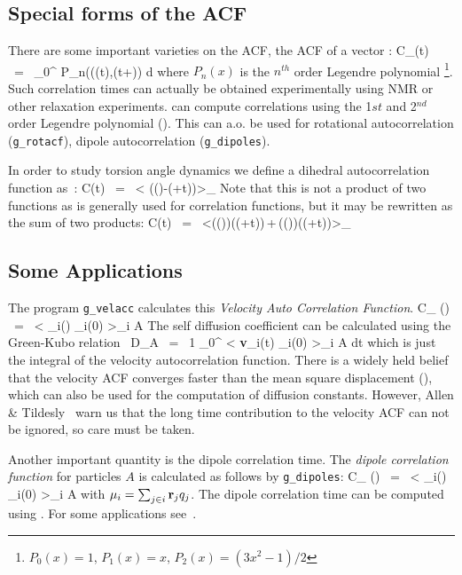 \subsection{Special forms of the ACF}
There are some important varieties on the ACF, {\eg} the ACF of a vector :
\beq
C_{}(t) ~=~	\int_0^{\infty} P_n(\cos\angle\left((t),(t+\xi)\right) {\rm d} \xi
\label{eqn:corrleg}
\eeq
where $P_n(x)$ is the $n^{th}$ order Legendre polynomial
\footnote{$P_0(x) = 1$, $P_1(x) = x$, $P_2(x) = (3x^2-1)/2$}.
Such correlation times 
can actually be obtained experimentally using {\eg} NMR or other relaxation 
experiments. {\gromacs} can compute correlations using 
the 1${st}$ and 2$^{nd}$ order Legendre polynomial ().
This can a.o. be used for rotational autocorrelation ({\tt g\_rotacf}), 
dipole autocorrelation ({\tt g\_dipoles}).

In order to study torsion angle dynamics we define a dihedral 
autocorrelation function as~\cite{Spoel97a}:
\beq
C(t)	~=~	\left< \cos(\theta(\tau)-\theta(\tau+t))\right>_{\tau}
\label{eqn:coenk}
\eeq
Note that this is not a  product of two functions 
as is generally used for correlation
functions, but it may be rewritten as the sum of two products:
\beq
C(t)	~=~	\left<\cos(\theta(\tau))\cos(\theta(\tau+t))\,+\,\sin(\theta(\tau))\sin(\theta(\tau+t))\right>_{\tau}
\label{eqn:cot}
\eeq

\subsection{Some Applications}
The program {\tt g\_velacc} calculates this {\em Velocity Auto Correlation 
Function}.
\beq
C_{} (\tau) ~=~ < {}_i(\tau) _i(0) >_{i \in A}
\eeq
The self diffusion coefficient can be calculated using the Green-Kubo 
relation~\cite{Allen87}
\beq
D_A ~=~ {1} \int_0^{\infty} < {\bf v}_i(t) _i(0) >_{i \in A} \; dt
\eeq
which is just the integral of the velocity autocorrelation function.
There is a widely held belief that the velocity ACF converges faster than the mean
square displacement (), which can also be used for the computation of 
diffusion constants. However, Allen \& Tildesly~\cite{Allen87} 
warn us that the long time 
contribution to the velocity ACF can not be ignored, so care must be taken.

Another important quantity is the dipole correlation time. The {\em dipole 
correlation function} for particles $A$ is calculated as follows by 
{\tt g\_dipoles}:
\beq
C_{\mu} (\tau) ~=~ < {\bf \mu}_i(\tau) \cdot {\bf \mu}_i(0) >_{i \in A}
\eeq
with ${\bf \mu}_i = \sum_{j \in i} {\bf r}_j q_j$. The dipole correlation time 
can be computed using .
For some applications see~\cite{Spoel98a}.

